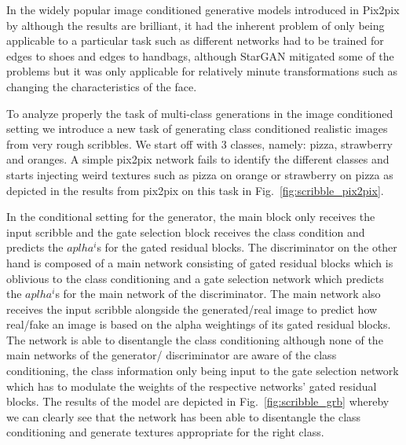 \documentclass[10pt,twocolumn,letterpaper]{article}
\def\figref#1{Fig.~\ref{#1}}
\begin{document}

In the widely popular image conditioned generative models introduced in Pix2pix by \cite{isola2016image2image} although the results are brilliant, it had the inherent problem of only being applicable to a particular task such as different networks had to be trained for edges to shoes and edges to handbags, although StarGAN \cite{choi2017stargan} mitigated some of the problems but it was only applicable for relatively minute transformations such as changing the characteristics of the face.

To analyze properly the task of multi-class generations in the image conditioned setting we introduce a new task of generating class conditioned realistic images from very rough scribbles. We start off with 3 classes, namely: pizza, strawberry and oranges. A simple pix2pix network fails to identify the different classes and starts injecting weird textures such as pizza on orange or strawberry on pizza as depicted in the results from pix2pix on this task in \figref{fig:scribble_pix2pix}. 

In the conditional setting for the generator, the main block only receives the input scribble and the gate selection block receives the class condition and predicts the $aplha^i$s for the gated residual blocks. The discriminator on the other hand is composed of a main network consisting of gated residual blocks which is oblivious to the class conditioning and a gate selection network which predicts the $aplha^i$s for the main network of the discriminator. The main network also receives the input scribble alongside the generated/real image to predict how real/fake an image is based on the alpha weightings of its gated residual blocks. The network is able to disentangle the class conditioning although none of the main networks of the generator/ discriminator are aware of the class conditioning, the class information only being input to the gate selection network which has to modulate the weights of the respective networks' gated residual blocks. The results of the model are depicted in \figref{fig:scribble_grb} whereby we can clearly see that the network has been able to disentangle the class conditioning and generate textures appropriate for the right class.
\end{document}
